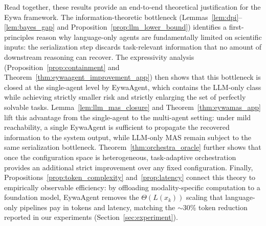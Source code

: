 Read together, these results provide an end-to-end theoretical justification for the Eywa framework. The information-theoretic bottleneck (Lemmas~\ref{lem:dpi}--\ref{lem:bayes_gap} and Proposition~\ref{prop:llm_lower_bound}) identifies a first-principles reason why language-only agents are fundamentally limited on scientific inputs: the serialization step discards task-relevant information that no amount of downstream reasoning can recover. The expressivity analysis (Proposition~\ref{prop:containment} and Theorem~\ref{thm:eywaagent_improvement_app}) then shows that this bottleneck is closed at the single-agent level by EywaAgent, which contains the LLM-only class while achieving strictly smaller risk and strictly enlarging the set of perfectly solvable tasks. Lemma~\ref{lem:llm_mas_closure} and Theorem~\ref{thm:eywamas_app} lift this advantage from the single-agent to the multi-agent setting: under mild reachability, a single EywaAgent is sufficient to propagate the recovered information to the system output, while LLM-only MAS remain subject to the same serialization bottleneck. Theorem~\ref{thm:orchestra_oracle} further shows that once the configuration space is heterogeneous, task-adaptive orchestration provides an additional strict improvement over any fixed configuration. Finally, Propositions~\ref{prop:token_complexity} and~\ref{prop:latency} connect this theory to empirically observable efficiency: by offloading modality-specific computation to a foundation model, EywaAgent removes the $\Theta(L(x_k))$ scaling that language-only pipelines pay in tokens and latency, matching the $\sim$30\% token reduction reported in our experiments (Section~\ref{sec:experiment}).